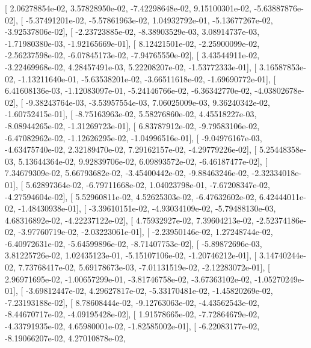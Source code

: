 \documentclass{article}
\begin{document}
       [  2.06278854e-02,   3.57828950e-02,  -7.42298648e-02,
          9.15100301e-02,  -5.63887876e-02],
       [ -5.37491201e-02,  -5.57861963e-02,   1.04932792e-01,
         -5.13677267e-02,  -3.92537806e-02],
       [ -2.23723885e-02,  -8.38903529e-03,   3.08914737e-03,
         -1.71980380e-03,  -1.92165669e-01],
       [  8.12421501e-02,  -2.25900099e-02,  -2.56237598e-02,
         -6.07845173e-02,  -7.94765550e-02],
       [  3.43544911e-02,  -3.22469968e-02,   4.28457491e-03,
          5.22208207e-02,  -1.53772333e-01],
       [  3.16587853e-02,  -1.13211640e-01,  -5.63538201e-02,
         -3.66511618e-02,  -1.69690772e-01],
       [  6.41608136e-03,  -1.12083097e-01,  -5.24146766e-02,
         -6.36342770e-02,  -4.03802678e-02],
       [ -9.38243764e-03,  -3.53957554e-03,   7.06025009e-03,
          9.36240342e-02,  -1.60752415e-01],
       [ -8.75163963e-02,   5.58276860e-02,   4.45518227e-03,
         -8.08944265e-02,  -1.31269723e-01],
       [  6.83787912e-02,  -9.79583106e-02,  -6.47082962e-02,
         -1.12626295e-02,  -1.04996516e-01],
       [ -9.04976167e-03,  -4.63475740e-02,   2.32189470e-02,
          7.29162157e-02,  -4.29779226e-02],
       [  5.25448358e-03,   5.13644364e-02,   9.92839706e-02,
          6.09893572e-02,  -6.46187477e-02],
       [  7.34679309e-02,   5.66793682e-02,  -3.45400442e-02,
         -9.88463246e-02,  -2.32334018e-01],
       [  5.62897364e-02,  -6.79711668e-02,   1.04023798e-01,
         -7.67208347e-02,  -4.27594604e-02],
       [  5.52960811e-02,   4.52625303e-02,  -6.47632602e-02,
          6.42444011e-02,  -1.48430938e-01],
       [ -3.39610151e-02,  -4.93034109e-02,  -5.79488130e-03,
          4.68316892e-02,  -4.22237122e-02],
       [  4.75932927e-02,   7.39604213e-02,  -2.52374186e-02,
         -3.97760719e-02,  -2.03223061e-01],
       [ -2.23950146e-02,   1.27248744e-02,  -6.40972631e-02,
         -5.64599896e-02,  -8.71407753e-02],
       [ -5.89872696e-03,   3.81225726e-02,   1.02435123e-01,
         -5.15107106e-02,  -1.20746212e-01],
       [  3.14740244e-02,   7.73768417e-02,   5.69178673e-03,
         -7.01131519e-02,  -2.12283072e-01],
       [  2.96971695e-02,  -1.00657299e-01,  -3.81746758e-02,
         -3.67363102e-02,  -1.05270249e-01],
       [ -3.69812447e-02,   4.29627817e-02,  -5.33170481e-02,
         -1.45820269e-02,  -7.23193188e-02],
       [  8.78608444e-02,  -9.12763063e-02,  -4.43562543e-02,
         -8.44670717e-02,  -4.09195428e-02],
       [  1.91578665e-02,  -7.72864679e-02,  -4.33791935e-02,
          4.65980001e-02,  -1.82585002e-01],
       [ -6.22083177e-02,  -8.19066207e-02,   4.27010878e-02,
\end{document}
